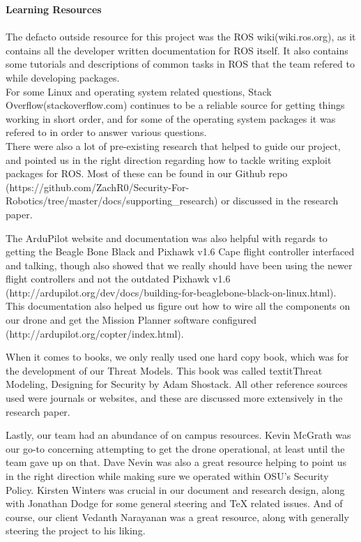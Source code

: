 \documentclass[IEEEtran,letterpaper,10pt,notitlepage,draftclsnofoot,onecolumn]{article}
\begin{document}
\LARGE\textbf{Learning Resources\\ \\}\normalsize
The defacto outside resource for this project was the ROS wiki\cite{ROSWIKI}(wiki.ros.org), as it
contains all the developer written documentation for ROS itself. It also
contains some tutorials and descriptions of common tasks in ROS that the
team refered to while developing packages.\\
For some Linux and operating system related questions, Stack Overflow\cite{SO}(stackoverflow.com)
continues to be a reliable source for getting things working in short order, and
for some of the operating system packages it was refered to in order to answer
various questions.\\
There were also a lot of pre-existing research that helped to guide our project, and pointed us in the right
direction regarding how to tackle writing exploit packages for ROS. Most of these can be found in our Github
repo \cite{GitRepoSupporting}(https://github.com/ZachR0/Security-For-Robotics/tree/master/docs/supporting_research) or discussed in the research paper.

The ArduPilot website and documentation was also helpful with regards to getting the Beagle Bone Black and
Pixhawk v1.6 Cape flight controller interfaced and talking, though also showed that we really should have been
using the newer flight controllers and not the outdated Pixhawk v1.6 \cite{ArduProjectDevDocs}(http://ardupilot.org/dev/docs/building-for-beaglebone-black-on-linux.html). This
documentation also helped us figure out how to wire all the components on our drone and get the Mission Planner software configured \cite{ArduProjectDocs}(http://ardupilot.org/copter/index.html).

When it comes to books, we only really used one hard copy book, which was for the development of our Threat Models.
This book was called textit{Threat Modeling, Designing for Security} by Adam Shostack. \cite{TMDS}
All other reference sources used were journals or websites, and these are discussed more extensively in the research paper.

Lastly, our team had an abundance of on campus resources. Kevin McGrath was our go-to
concerning attempting to get the drone operational, at least until the team gave up on
that. Dave Nevin was also a great resource helping to point us in the right direction while making sure
we operated within OSU's Security Policy.
Kirsten Winters was crucial in our document and research design, along with Jonathan
Dodge for some general steering and TeX related issues. And of course, our client Vedanth
Narayanan was a great resource, along with generally steering the project to his liking.
\end{document}
